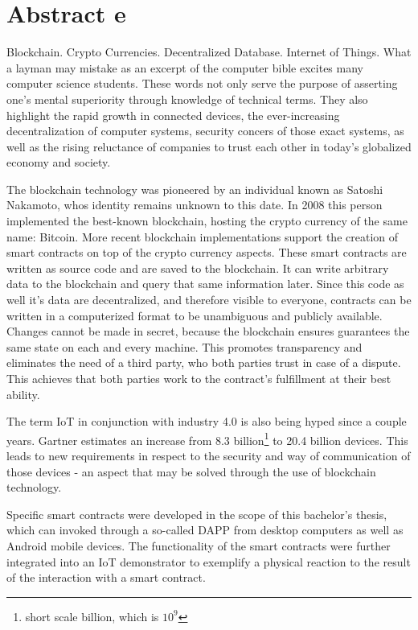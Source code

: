 \chapter{Abstract e}
\label{cha:abstract_e}

Blockchain. Crypto Currencies. Decentralized Database. Internet of Things. What a layman may mistake as an excerpt of the computer bible excites many computer science students. These words not only serve the purpose of asserting one's mental superiority through knowledge of technical terms. They also highlight the rapid growth in connected devices, the ever-increasing decentralization of computer systems, security concers of those exact systems, as well as the rising reluctance of companies to trust each other in today's globalized economy and society.

The blockchain technology was pioneered by an individual known as Satoshi Nakamoto, whos identity remains unknown to this date. In 2008 this person implemented the best-known blockchain, hosting the crypto currency of the same name: Bitcoin. More recent blockchain implementations support the creation of smart contracts on top of the crypto currency aspects. These smart contracts are written as source code and are saved to the blockchain. It can write arbitrary data to the blockchain and query that same information later. Since this code as well it's data are decentralized, and therefore visible to everyone, contracts can be written in a computerized format to be unambiguous and publicly available. Changes cannot be made in secret, because the blockchain ensures guarantees the same state on each and every machine. This promotes transparency and eliminates the need of a third party, who both parties trust in case of a dispute. This achieves that both parties work to the contract's fulfillment at their best ability.

The term \acrshort{IoT} in conjunction with industry 4.0 is also being hyped since a couple years. Gartner estimates an increase from 8.3 billion\footnote{short scale billion, which is $10^{9}$} to 20.4 billion devices. This leads to new requirements in respect to the security and way of communication of those devices - an aspect that may be solved through the use of blockchain technology.\cite{gartner.com_iot,BlockchainRevolution}

Specific smart contracts were developed in the scope of this bachelor's thesis, which can invoked through a so-called \acrfull{DAPP} from desktop computers as well as Android mobile devices. The functionality of the smart contracts were further integrated into an IoT demonstrator to exemplify a physical reaction to the result of the interaction with a smart contract.